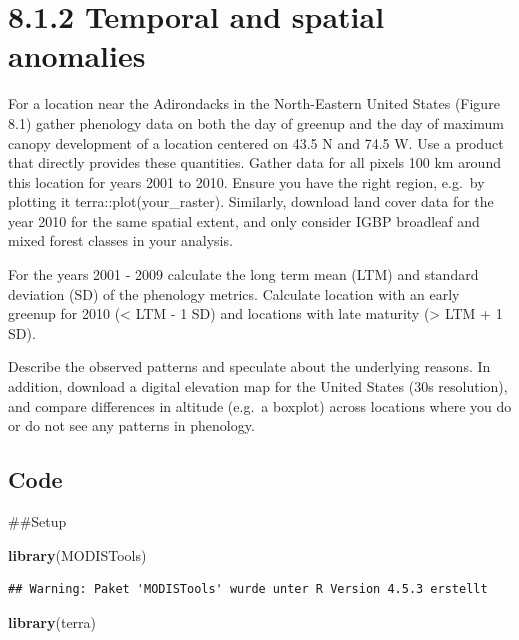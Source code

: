 \documentclass[
]{article}
\newenvironment{Shaded}{\begin{snugshade}}{\end{snugshade}}
\newcommand{\FunctionTok}[1]{\textcolor[rgb]{0.13,0.29,0.53}{\textbf{#1}}}
\newcommand{\NormalTok}[1]{#1}
\begin{document}
\section{8.1.2 Temporal and spatial
anomalies}\label{temporal-and-spatial-anomalies}

For a location near the Adirondacks in the North-Eastern United States
(Figure 8.1) gather phenology data on both the day of greenup and the
day of maximum canopy development of a location centered on 43.5 N and
74.5 W. Use a product that directly provides these quantities. Gather
data for all pixels 100 km around this location for years 2001 to 2010.
Ensure you have the right region, e.g.~by plotting it
terra::plot(your\_raster). Similarly, download land cover data for the
year 2010 for the same spatial extent, and only consider IGBP broadleaf
and mixed forest classes in your analysis.

For the years 2001 - 2009 calculate the long term mean (LTM) and
standard deviation (SD) of the phenology metrics. Calculate location
with an early greenup for 2010 (\textless{} LTM - 1 SD) and locations
with late maturity (\textgreater{} LTM + 1 SD).

Describe the observed patterns and speculate about the underlying
reasons. In addition, download a digital elevation map for the United
States (30s resolution), and compare differences in altitude (e.g.~a
boxplot) across locations where you do or do not see any patterns in
phenology.

\subsection{Code}\label{code}

\#\#Setup

\begin{Shaded}
\begin{Highlighting}[]
\FunctionTok{library}\NormalTok{(MODISTools)}
\end{Highlighting}
\end{Shaded}

\begin{verbatim}
## Warning: Paket 'MODISTools' wurde unter R Version 4.5.3 erstellt
\end{verbatim}

\begin{Shaded}
\begin{Highlighting}[]
\FunctionTok{library}\NormalTok{(terra)}
\end{Highlighting}
\end{Shaded}
\end{document}
